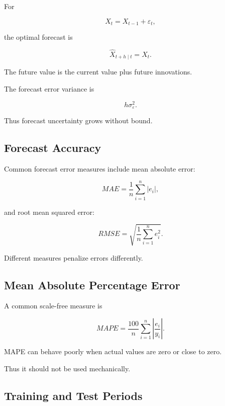 For

\[
X_t
=
X_{t-1}
+
\varepsilon_t,
\]

the optimal forecast is

\[
\boxed{
\widehat{X}_{t+h\mid t}
=
X_t.
}
\]

The future value is the current value plus future innovations.

The forecast error variance is

\[
\boxed{
h\sigma_\varepsilon^2.
}
\]

Thus forecast uncertainty grows without bound.

\subsection{Forecast Accuracy}
\label{subsec:forecast-accuracy}

Common forecast error measures include mean absolute error:

\[
\boxed{
MAE
=
\frac1n
\sum_{i=1}^{n}
|e_i|,
}
\]

and root mean squared error:

\[
\boxed{
RMSE
=
\sqrt{
\frac1n
\sum_{i=1}^{n}
e_i^2
}.
}
\]

Different measures penalize errors differently.

\subsection{Mean Absolute Percentage Error}
\label{subsec:mape}

A common scale-free measure is

\[
\boxed{
MAPE
=
\frac{100}{n}
\sum_{i=1}^{n}
\left|
\frac{
e_i
}{
y_i
}
\right|.
}
\]

MAPE can behave poorly when actual values are zero or close to zero.

Thus it should not be used mechanically.

\subsection{Training and Test Periods}
\label{subsec:time-series-training-test}

